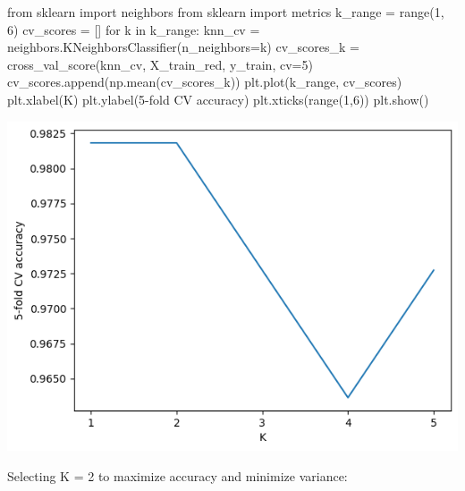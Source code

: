 \documentclass[
  11pt,
  letterpaper,
  DIV=11,
  numbers=noendperiod]{scrartcl}
\newenvironment{Shaded}{\begin{snugshade}}{\end{snugshade}}
\newcommand{\BuiltInTok}[1]{\textcolor[rgb]{0.00,0.23,0.31}{#1}}
\newcommand{\ControlFlowTok}[1]{\textcolor[rgb]{0.00,0.23,0.31}{#1}}
\newcommand{\DecValTok}[1]{\textcolor[rgb]{0.68,0.00,0.00}{#1}}
\newcommand{\ImportTok}[1]{\textcolor[rgb]{0.00,0.46,0.62}{#1}}
\newcommand{\KeywordTok}[1]{\textcolor[rgb]{0.00,0.23,0.31}{#1}}
\newcommand{\NormalTok}[1]{\textcolor[rgb]{0.00,0.23,0.31}{#1}}
\newcommand{\OperatorTok}[1]{\textcolor[rgb]{0.37,0.37,0.37}{#1}}
\newcommand{\StringTok}[1]{\textcolor[rgb]{0.13,0.47,0.30}{#1}}
\begin{document}
\begin{Shaded}
\begin{Highlighting}[]
\ImportTok{from}\NormalTok{ sklearn }\ImportTok{import}\NormalTok{ neighbors}
\ImportTok{from}\NormalTok{ sklearn }\ImportTok{import}\NormalTok{ metrics}
\NormalTok{k\_range }\OperatorTok{=} \BuiltInTok{range}\NormalTok{(}\DecValTok{1}\NormalTok{, }\DecValTok{6}\NormalTok{)}
\NormalTok{cv\_scores }\OperatorTok{=}\NormalTok{ [] }
\ControlFlowTok{for}\NormalTok{ k }\KeywordTok{in}\NormalTok{ k\_range:}
\NormalTok{    knn\_cv }\OperatorTok{=}\NormalTok{ neighbors.KNeighborsClassifier(n\_neighbors}\OperatorTok{=}\NormalTok{k)}
\NormalTok{    cv\_scores\_k }\OperatorTok{=}\NormalTok{ cross\_val\_score(knn\_cv, X\_train\_red, y\_train, cv}\OperatorTok{=}\DecValTok{5}\NormalTok{)}
\NormalTok{    cv\_scores.append(np.mean(cv\_scores\_k))}
\NormalTok{plt.plot(k\_range, cv\_scores)}
\NormalTok{plt.xlabel(}\StringTok{\textquotesingle{}K\textquotesingle{}}\NormalTok{)}
\NormalTok{plt.ylabel(}\StringTok{\textquotesingle{}5{-}fold CV accuracy\textquotesingle{}}\NormalTok{)}
\NormalTok{plt.xticks(}\BuiltInTok{range}\NormalTok{(}\DecValTok{1}\NormalTok{,}\DecValTok{6}\NormalTok{))}
\NormalTok{plt.show()}
\end{Highlighting}
\end{Shaded}

\includegraphics{Seebach_Lily_HW6_files/figure-pdf/cell-18-output-1.png}

Selecting K = 2 to maximize accuracy and minimize variance:
\end{document}
